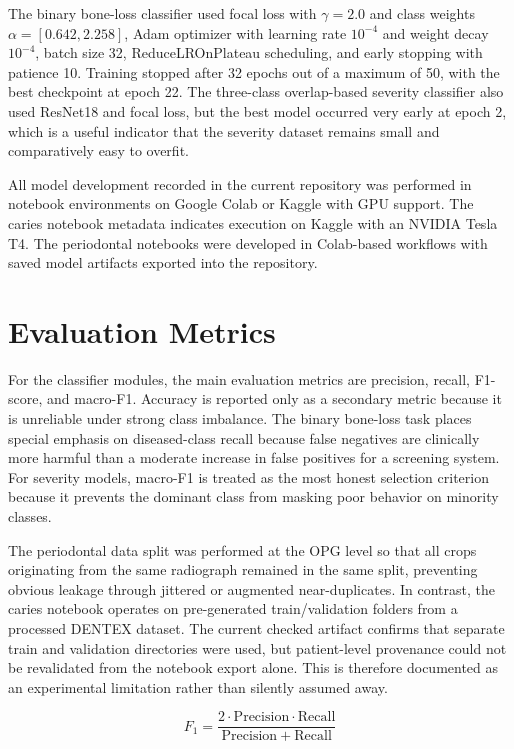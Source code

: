 The binary bone-loss classifier used focal loss with \(\gamma = 2.0\) and
class weights \(\alpha = [0.642, 2.258]\), Adam optimizer with learning rate
\(10^{-4}\) and weight decay \(10^{-4}\), batch size 32, ReduceLROnPlateau
scheduling, and early stopping with patience 10. Training stopped after
32 epochs out of a maximum of 50, with the best checkpoint at epoch 22. The
three-class overlap-based severity classifier also used ResNet18 and focal
loss, but the best model occurred very early at epoch 2, which is a useful
indicator that the severity dataset remains small and comparatively easy to
overfit.

All model development recorded in the current repository was performed in
notebook environments on Google Colab or Kaggle with GPU support. The caries
notebook metadata indicates execution on Kaggle with an NVIDIA Tesla T4. The
periodontal notebooks were developed in Colab-based workflows with saved model
artifacts exported into the repository.

\section{Evaluation Metrics}
\label{sec:method-metrics}

For the classifier modules, the main evaluation metrics are precision, recall,
F1-score, and macro-F1. Accuracy is reported only as a secondary metric because
it is unreliable under strong class imbalance. The binary bone-loss task places
special emphasis on diseased-class recall because false negatives are
clinically more harmful than a moderate increase in false positives for a
screening system. For severity models, macro-F1 is treated as the most honest
selection criterion because it prevents the dominant class from masking poor
behavior on minority classes.

The periodontal data split was performed at the OPG level so that all crops
originating from the same radiograph remained in the same split, preventing
obvious leakage through jittered or augmented near-duplicates. In contrast, the
caries notebook operates on pre-generated train/validation folders from a
processed DENTEX dataset. The current checked artifact confirms that separate
train and validation directories were used, but patient-level provenance could
not be revalidated from the notebook export alone. This is therefore documented
as an experimental limitation rather than silently assumed away.

\begin{equation}
  \label{eq:f1}
  F_1 = \frac{2 \cdot \mathrm{Precision} \cdot \mathrm{Recall}}{\mathrm{Precision} + \mathrm{Recall}}
\end{equation}

